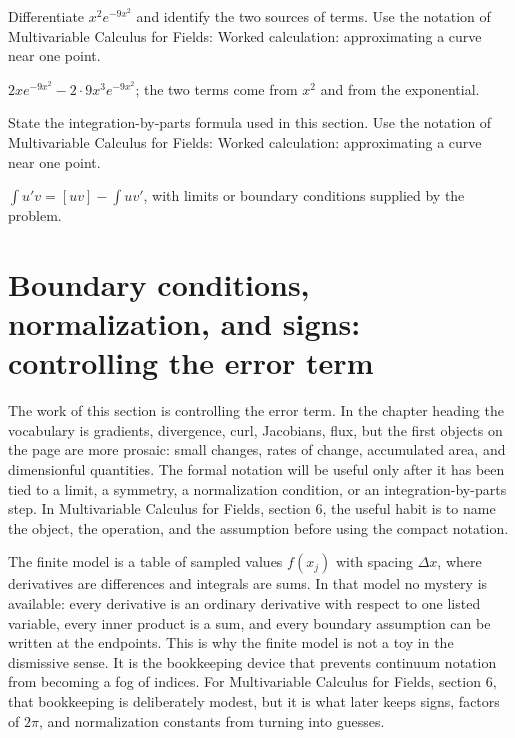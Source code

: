 \begin{exercise}
Differentiate \(x^2e^{-9x^2}\) and identify the two sources of terms.  Use the notation of Multivariable Calculus for Fields: Worked calculation: approximating a curve near one point.
\begin{answer}
\(2xe^{-9x^2}-2\cdot 9x^3e^{-9x^2}\); the two terms come from \(x^2\) and from the exponential.
\end{answer}
\end{exercise}

\begin{exercise}
State the integration-by-parts formula used in this section.  Use the notation of Multivariable Calculus for Fields: Worked calculation: approximating a curve near one point.
\begin{answer}
\(\int u'v=[uv]-\int uv'\), with limits or boundary conditions supplied by the problem.
\end{answer}
\end{exercise}



\section{Boundary conditions, normalization, and signs: controlling the error term}

The work of this section is controlling the error term.  In the chapter heading the vocabulary is gradients, divergence, curl, Jacobians, flux, but the first objects on the page are more prosaic: small changes, rates of change, accumulated area, and dimensionful quantities.  The formal notation will be useful only after it has been tied to a limit, a symmetry, a normalization condition, or an integration-by-parts step.  In Multivariable Calculus for Fields, section 6, the useful habit is to name the object, the operation, and the assumption before using the compact notation.

The finite model is a table of sampled values \(f(x_j)\) with spacing \(\Delta x\), where derivatives are differences and integrals are sums.  In that model no mystery is available: every derivative is an ordinary derivative with respect to one listed variable, every inner product is a sum, and every boundary assumption can be written at the endpoints.  This is why the finite model is not a toy in the dismissive sense.  It is the bookkeeping device that prevents continuum notation from becoming a fog of indices.  For Multivariable Calculus for Fields, section 6, that bookkeeping is deliberately modest, but it is what later keeps signs, factors of \(2\pi\), and normalization constants from turning into guesses.

